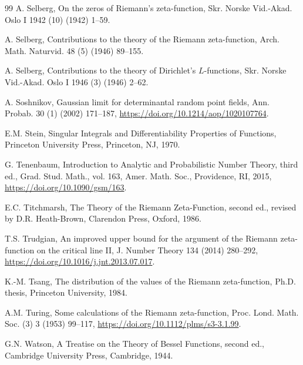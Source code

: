 \documentclass[preprint,12pt]{elsarticle}
\numberwithin{equation}{section}
\theoremstyle{plain}
\theoremstyle{definition}
\theoremstyle{remark}
\begin{document}
\begin{thebibliography}{99}
A. Selberg, On the zeros of Riemann's zeta-function, Skr. Norske Vid.-Akad. Oslo I 1942 (10) (1942) 1--59.%

A. Selberg, Contributions to the theory of the Riemann zeta-function, Arch. Math. Naturvid. 48 (5) (1946) 89--155.

A. Selberg, Contributions to the theory of Dirichlet's $L$-functions, Skr. Norske Vid.-Akad. Oslo I 1946 (3) (1946) 2--62.

A. Soshnikov, Gaussian limit for determinantal random point fields, Ann. Probab. 30 (1) (2002) 171--187, \href{https://doi.org/10.1214/aop/1020107764}{https://doi.org/10.1214/aop/1020107764}.

E.M. Stein, Singular Integrals and Differentiability Properties of Functions, Princeton University Press, Princeton, NJ, 1970.

G. Tenenbaum, Introduction to Analytic and Probabilistic Number Theory, third ed., Grad. Stud. Math., vol. 163, Amer. Math. Soc., Providence, RI, 2015, \href{https://doi.org/10.1090/gsm/163}{https://doi.org/10.1090/gsm/163}.

E.C. Titchmarsh, The Theory of the Riemann Zeta-Function, second ed., revised by D.R. Heath-Brown, Clarendon Press, Oxford, 1986.

T.S. Trudgian, An improved upper bound for the argument of the Riemann zeta-function on the critical line II, J. Number Theory 134 (2014) 280--292, \href{https://doi.org/10.1016/j.jnt.2013.07.017}{https://doi.org/10.1016/j.jnt.2013.07.017}.

K.-M. Tsang, The distribution of the values of the Riemann zeta-function, Ph.D. thesis, Princeton University, 1984.

A.M. Turing, Some calculations of the Riemann zeta-function, Proc. Lond. Math. Soc. (3) 3 (1953) 99--117, \href{https://doi.org/10.1112/plms/s3-3.1.99}{https://doi.org/10.1112/plms/s3-3.1.99}.%

G.N. Watson, A Treatise on the Theory of Bessel Functions, second ed., Cambridge University Press, Cambridge, 1944.

\end{thebibliography}

\appendix
\end{document}
